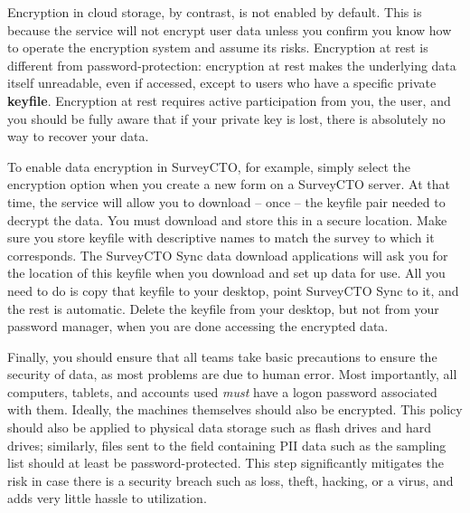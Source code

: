 Encryption in cloud storage, by contrast, is not enabled by default.
This is because the service will not encrypt user data unless you confirm
you know how to operate the encryption system and assume its risks.
Encryption at rest is different from password-protection:
encryption at rest makes the underlying data itself unreadable,
even if accessed, except to users who have a specific private \textbf{keyfile}.
Encryption at rest requires active participation from you, the user,
and you should be fully aware that if your private key is lost,
there is absolutely no way to recover your data.

To enable data encryption in SurveyCTO, for example,
simply select the encryption option
when you create a new form on a SurveyCTO server.
At that time, the service will allow you to download -- once --
the keyfile pair needed to decrypt the data.
You must download and store this in a secure location. Make sure you store keyfile with descriptive names to match the survey to which it corresponds.
The SurveyCTO Sync data download applications will ask you for the location of this keyfile
when you download and set up data for use.
All you need to do is copy that keyfile to your desktop,
point SurveyCTO Sync to it, and the rest is automatic.
Delete the keyfile from your desktop, but not from your password manager,
when you are done accessing the encrypted data.

Finally, you should ensure that all teams take basic precautions
to ensure the security of data, as most problems are due to human error.
Most importantly, all computers, tablets, and accounts used
\textit{must} have a logon password associated with them. Ideally, the machines themselves should also be encrypted.
This policy should also be applied to physical data storage
such as flash drives and hard drives;
similarly, files sent to the field containing PII data
such as the sampling list should at least be password-protected.
This step significantly mitigates the risk in case there is
a security breach such as loss, theft, hacking, or a virus,
and adds very little hassle to utilization.


